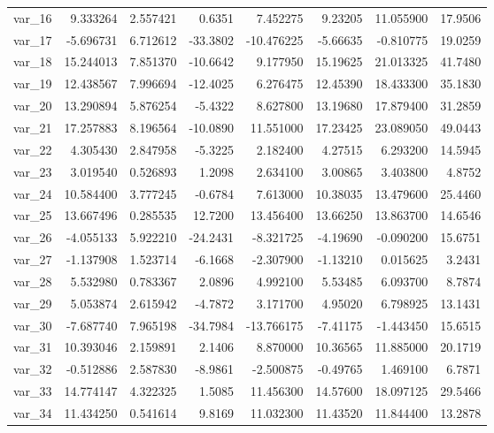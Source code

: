 ﻿\documentclass[12pt]{article}
\begin{document}
\begin{longtable}{lrrrrrrr}
  var\_16 &   9.333264 &   2.557421 &   0.6351 &   7.452275 &   9.23205 &  11.055900 &  17.9506 \\
  var\_17 &  -5.696731 &   6.712612 & -33.3802 & -10.476225 &  -5.66635 &  -0.810775 &  19.0259 \\
  var\_18 &  15.244013 &   7.851370 & -10.6642 &   9.177950 &  15.19625 &  21.013325 &  41.7480 \\
  var\_19 &  12.438567 &   7.996694 & -12.4025 &   6.276475 &  12.45390 &  18.433300 &  35.1830 \\
  var\_20 &  13.290894 &   5.876254 &  -5.4322 &   8.627800 &  13.19680 &  17.879400 &  31.2859 \\
  var\_21 &  17.257883 &   8.196564 & -10.0890 &  11.551000 &  17.23425 &  23.089050 &  49.0443 \\
  var\_22 &   4.305430 &   2.847958 &  -5.3225 &   2.182400 &   4.27515 &   6.293200 &  14.5945 \\
  var\_23 &   3.019540 &   0.526893 &   1.2098 &   2.634100 &   3.00865 &   3.403800 &   4.8752 \\
  var\_24 &  10.584400 &   3.777245 &  -0.6784 &   7.613000 &  10.38035 &  13.479600 &  25.4460 \\
  var\_25 &  13.667496 &   0.285535 &  12.7200 &  13.456400 &  13.66250 &  13.863700 &  14.6546 \\
  var\_26 &  -4.055133 &   5.922210 & -24.2431 &  -8.321725 &  -4.19690 &  -0.090200 &  15.6751 \\
  var\_27 &  -1.137908 &   1.523714 &  -6.1668 &  -2.307900 &  -1.13210 &   0.015625 &   3.2431 \\
  var\_28 &   5.532980 &   0.783367 &   2.0896 &   4.992100 &   5.53485 &   6.093700 &   8.7874 \\
  var\_29 &   5.053874 &   2.615942 &  -4.7872 &   3.171700 &   4.95020 &   6.798925 &  13.1431 \\
  var\_30 &  -7.687740 &   7.965198 & -34.7984 & -13.766175 &  -7.41175 &  -1.443450 &  15.6515 \\
  var\_31 &  10.393046 &   2.159891 &   2.1406 &   8.870000 &  10.36565 &  11.885000 &  20.1719 \\
  var\_32 &  -0.512886 &   2.587830 &  -8.9861 &  -2.500875 &  -0.49765 &   1.469100 &   6.7871 \\
  var\_33 &  14.774147 &   4.322325 &   1.5085 &  11.456300 &  14.57600 &  18.097125 &  29.5466 \\
  var\_34 &  11.434250 &   0.541614 &   9.8169 &  11.032300 &  11.43520 &  11.844400 &  13.2878 \\

\end{longtable}
\end{document}
